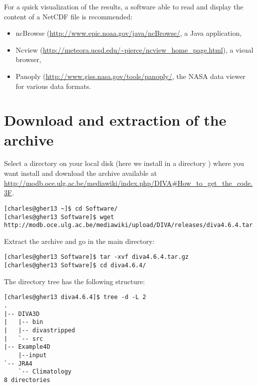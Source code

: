 For a quick visualization of the results, a software able to read and display the content of a NetCDF  file is recommended:
\begin{itemize}
\item ncBrowse (\url{http://www.epic.noaa.gov/java/ncBrowse/}, a Java application,
\item Ncview (\url{http://meteora.ucsd.edu/~pierce/ncview_home_page.html}), a visual browser, 
\item Panoply (\url{http://www.giss.nasa.gov/tools/panoply/}, the NASA data viewer for various data formats.
\end{itemize}


\section{Download and extraction of the archive}
Select a directory on your local disk (here we install in a directory ) where you want install \diva and download the archive available at \url{http://modb.oce.ulg.ac.be/mediawiki/index.php/DIVA#How_to_get_the_code.3F}.

\begin{lstlisting}[style=Bash]
[charles@gher13 ~]$ cd Software/
[charles@gher13 Software]$ wget http://modb.oce.ulg.ac.be/mediawiki/upload/DIVA/releases/diva4.6.4.tar.gz
\end{lstlisting}

Extract the archive and go in the main directory:
\begin{lstlisting}[style=Bash]
[charles@gher13 Software]$ tar -xvf diva4.6.4.tar.gz
[charles@gher13 Software]$ cd diva4.6.4/
\end{lstlisting}

The directory tree has the following structure: %
\begin{lstlisting}[style=Bash]
[charles@gher13 diva4.6.4]$ tree -d -L 2
.
|-- DIVA3D
|   |-- bin
|   |-- divastripped
|   `-- src
|-- Example4D
	|--input
`-- JRA4
    `-- Climatology
8 directories
\end{lstlisting}



